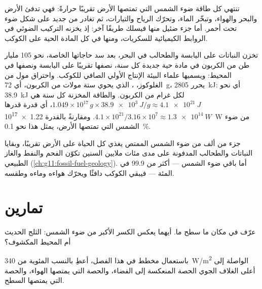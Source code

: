 تنتهي كل طاقة ضوء الشمس التي تمتصها الأرض تقريبًا حرارةً: فهي تدفئ الأرض والبحر
والهواء، وتبخّر الماء، وتحرّك الرياح والتيارات، ثم تغادر من جديد على شكل ضوء تحت
أحمر. أما جزء ضئيل منها فيسلك طريقًا آخر: إذ يخزنه التركيب الضوئي في الروابط
الكيميائية للسكريات، ومنها في كل المادة الحية على الكوكب.

\begin{example}\label{ex:g10:earth-energy-budget:photosynthesis}
تخزن النباتات على اليابسة والطحالب في البحر، بعد سد حاجاتها الخاصة، نحو
\num{105} مليار طن من الكربون في مادة حية جديدة كل سنة، نصفها تقريبًا على
اليابسة ونصفها في المحيط: ويسميها علماء البيئة الإنتاج الأولي الصافي للكوكب.
واحتراق مول من الغلوكوز،
، الذي يحوي ستة مولات من الكربون، أي \qty{72}{g}، يحرر
\qty{2805}{kJ}: أي نحو \qty{38.9}{kJ} لكل غرام من الكربون. والطاقة المخزنة
كل سنة هي $1.049\times10^{17}\,\unit{g} \times \qty{38.9e3}{J/g} \approx
\qty{4.1e21}{J}$، أي قدرة قدرها $4.1\times10^{21}/3.16\times10^{7} \approx
\qty{1.3e14}{W}$. ومقارنةً بالقدرة \qty{1.22e17}{W} من ضوء الشمس التي تمتصها
الأرض، يمثل هذا نحو \qty{0.1}{\percent}.
\end{example}

\begin{remark}\label{rem:g10:earth-energy-budget:life}
جزء من ألف من ضوء الشمس الممتص يغذي كل الحياة على الأرض تقريبًا، وبقايا النباتات
والطحالب المدفونة على مدى مئات ملايين السنين تكوّن الفحم والنفط والغاز الطبيعي
(\cref{ch:g11:fossil-fuel-geology}). أما باقي ضوء الشمس --- أكثر من 99.9 في
المئة --- فيبقي الكوكب دافئًا ويحرّك هواءه وماءه وطقسه.
\end{remark}

\section{تمارين}

\begin{exercise}[$\star$]\label{exo:g10:earth-energy-budget:1}
عرّف  في مكان ما  سطح ما. أيهما يعكس الكسر الأكبر من ضوء الشمس:
الثلج الحديث أم المحيط المكشوف؟
\end{exercise}

\begin{exercise}[$\star$]\label{exo:g10:earth-energy-budget:2}
باستعمال مخطط  في هذا الفصل، أعطِ بالنسب المئوية من
\qty{340}{W/m^2} الواصلة إلى أعلى الغلاف الجوي الحصة المنعكسة إلى الفضاء،
والحصة التي يمتصها الهواء، والحصة التي يمتصها
السطح.
\end{exercise}

